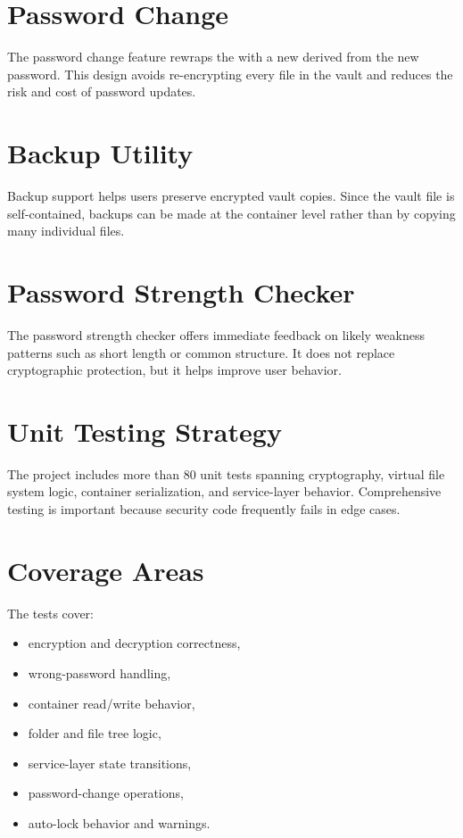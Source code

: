 \section{Password Change}
The password change feature rewraps the \mvk{} with a new \kek{} derived from the new password. This design avoids re-encrypting every file in the vault and reduces the risk and cost of password updates.

\section{Backup Utility}
Backup support helps users preserve encrypted vault copies. Since the vault file is self-contained, backups can be made at the container level rather than by copying many individual files.

\section{Password Strength Checker}
The password strength checker offers immediate feedback on likely weakness patterns such as short length or common structure. It does not replace cryptographic protection, but it helps improve user behavior.

\section{Unit Testing Strategy}
The project includes more than 80 unit tests spanning cryptography, virtual file system logic, container serialization, and service-layer behavior. Comprehensive testing is important because security code frequently fails in edge cases.

\section{Coverage Areas}
The tests cover:
\begin{itemize}
  \item encryption and decryption correctness,
  \item wrong-password handling,
  \item container read/write behavior,
  \item folder and file tree logic,
  \item service-layer state transitions,
  \item password-change operations,
  \item auto-lock behavior and warnings.
\end{itemize}

